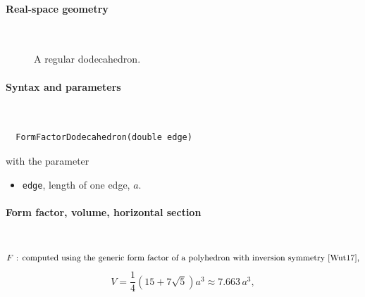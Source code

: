  \label{SDodecahedron}

\paragraph{Real-space geometry}\strut\\

\begin{figure}[H]
\strut\hfill
{}
\hfill\strut
\caption{A regular dodecahedron.}
\end{figure}

\FloatBarrier

\paragraph{Syntax and parameters}\strut\\[-2ex plus .2ex minus .2ex]
\begin{lstlisting}
  FormFactorDodecahedron(double edge)
\end{lstlisting}
with the parameter
\begin{itemize}
\item \texttt{edge}, length of one edge, $a$.
\end{itemize}

\paragraph{Form factor, volume, horizontal section}\strut\\
\begin{equation*}
  F \text{~: computed using the generic form factor of a polyhedron
             with inversion symmetry~\cite{Wut17},}
\end{equation*}
\begin{equation*}
  V= \frac{1}{4} (15+7\sqrt{5}) a^3 \approx 7.663\,a^3,
\end{equation*}

